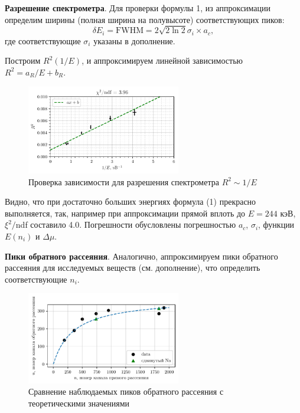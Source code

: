 \newpage 

\textbf{Разрешение спектрометра}. Для проверки формулы 1, из аппроксимации определим ширины (полная ширина на полувысоте) соответствующих пиков:
\begin{equation*}
    \delta E_i = \text{FWHM} = 2 \sqrt{2 \ln 2} \sigma_i \times a_c,
\end{equation*}
где соответствующие $\sigma_i$ указаны в дополнение. 

Построим $R^2(1/E)$, и аппроксимируем линейной зависимостью $R^2 = a_R/E + b_R$.
\begin{figure}[h]
    \centering
    \includegraphics[width=0.6\textwidth]{figures/dpi.pdf}
    \caption{Проверка зависимости для разрешения спектрометра $R^2 \sim 1/E$}
\end{figure}
Видно, что при достаточно больших энергиях формула (1) прекрасно выполняется, так, например при аппроксимации прямой вплоть до $E = 244$ кэВ, $\xi^2/$ndf составило 4.0. Погрешности обусловлены погрешностью $a_c$, $\sigma_i$, функции $E(n_i)$ и $\Delta \mu$.



\textbf{Пики обратного рассеяния}. Аналогично, аппроксимируем пики обратного рассеяния для исследуемых веществ (см. дополнение), что определить соответствующие $n_i$. 



\begin{figure}[h]
    \centering
    \includegraphics[width=0.6\textwidth]{figures/back.pdf}
    \caption{Сравнение наблюдаемых пиков обратного рассеяния с теоретическими значениями}
    \label{fig:3}
\end{figure}

